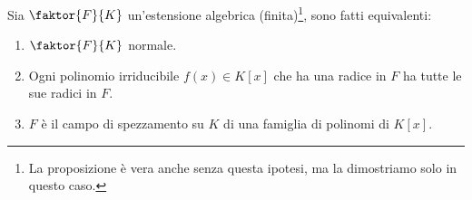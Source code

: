 \documentclass[11pt]{scrartcl}
\begin{document}
\begin{proposition}
    \label{3.46}
    Sia $\faktor{F}{K}$ un'estensione algebrica (finita)\footnote{La proposizione è vera anche senza questa ipotesi, ma la dimostriamo solo in questo caso.}, sono fatti equivalenti:
    \begin{enumerate}[(1)]
        \item $\faktor{F}{K}$ normale.
        \item Ogni polinomio irriducibile $f(x) \in K[x]$ che ha una radice in $F$ ha tutte le sue radici in $F$.
        \item $F$ è il campo di spezzamento su $K$ di una famiglia di polinomi di $K[x]$.
    \end{enumerate}
\end{proposition}
\end{document}
